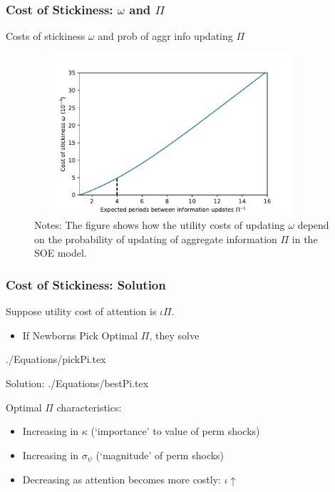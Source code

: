 \documentclass{beamer}\usepackage{dcolumn}
\providecommand{\econtexRoot}{.}
\providecommand{\eq}{\econtexRoot/Equations}
\begin{document}
\begin{frame}
\frametitle{Cost of Stickiness: $\omega$ and $\Pi$}

Costs of stickiness $\omega$ and prob of aggr info updating $\Pi$

\begin{figure}
\label{costOfStickiness}
\includegraphics[width=0.9\textwidth, height=6cm]{../Figures/uCostvsPiInv.pdf}\\
\tiny Notes: The figure shows how the utility costs of updating $\omega$ depend on the probability of updating of aggregate information $\Pi$ in the SOE model.
\end{figure}

\end{frame}




\begin{frame}
\frametitle{Cost of Stickiness: Solution}
Suppose utility cost of attention is $\iota\Pi$.
\begin{itemize}
\item If Newborns Pick Optimal $\Pi$, they solve
\end{itemize}

 \eq/pickPi.tex

Solution:
 \eq/bestPi.tex

Optimal $\Pi$ characteristics:
\begin{itemize}
\item Increasing in $\kappa$ (`importance' to value of perm shocks)
\item Increasing in $\sigma_{\psi}$ (`magnitude' of perm shocks)
\item Decreasing as attention becomes more costly: $\iota \uparrow$
\end{itemize}


\end{frame}
\end{document}
